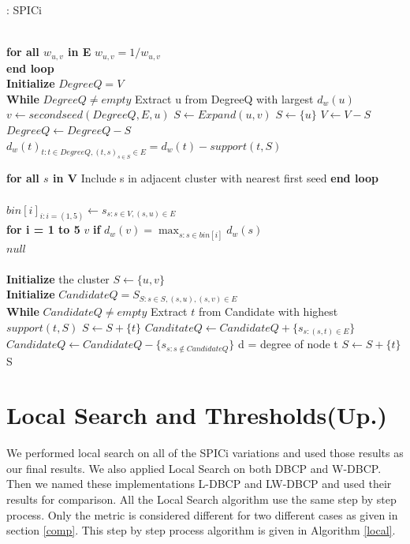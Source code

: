 \documentclass[10pt]{extarticle}
\begin{document}
	\begin{algorithm}
		\caption{: SPICi}\label{mspicicode}
		\begin{algorithmic}[1]
			 \\
			\textbf{for all $w_{u,v}$ in E}
			\State $w_{u,v}=1/w_{u,v}$\\
			\textbf{end loop} \\
			\textbf{Initialize} $DegreeQ = V$ \\
			\textbf{While} $DegreeQ \neq empty$
			\State Extract u from DegreeQ with largest $d_w(u)$
			\State $v \gets secondseed(DegreeQ,E,u)$
			 $S \gets Expand(u,v)$
			\EndIf
			\Else 
			\State $S \gets \{u\}$
			\EndIf
			\State $V \gets V - S $
			\State $Degree Q \gets Degree Q - S$
			\State $d_w(t)_{t:t\in DegreeQ,(t,s)_{s\in S}\in E} = d_w(t) - support(t,S)$
			
			\textbf{for all $s$ in V}
			\State Include s in adjacent cluster with nearest first seed
			\EndIf
			\textbf{end loop}
			\EndProcedure\\
			 \\
			$bin[i]_{i:i=(1,5)} \gets s_{s:s\in V,(s,u)\in E}$ \\
			\textbf{for i = 1 to 5}
			\State \Return $v$ \textbf{if} $d_w(v)=\max_{s:s\in bin[i]}{d_w(s)}$
			\EndIf\\
			\Return $null$
			\EndProcedure\\
			\\
			\textbf{Initialize} the cluster $S \gets \{u,v\}$ \\
			\textbf{Initialize} $CandidateQ = S_{S:s\in S,(s,u),(s,v)\in E}$\\
			\textbf{While} $CandidateQ \neq empty$
			\State Extract $t$ from Candidate with highest $support(t,S)$
			\State $S\gets S+\{t\}$
			\State $CanditateQ \gets CandidateQ + \{s_{s:(s,t)\in E}\}$
			\State $CandidateQ \gets CandidateQ - \{s_{s:s\not\in CandidateQ}\}$
			\Else
			\State d = degree of node t
				\State $S\gets S+\{t\}$
				\EndIf
			\EndIf \\
			\Return S
			\EndProcedure
		\end{algorithmic}
	\end{algorithm}
	
	
	\section{Local Search and Thresholds(Up.)}
	We performed local search on all of the SPICi variations and used those results as our final results. We also applied Local Search on both DBCP and W-DBCP. Then we named these implementations L-DBCP and LW-DBCP and used their results for comparison. All the Local Search algorithm use the same step by step process. Only the metric is considered different for two different cases as given in section \ref{comp}. This step by step process algorithm is given in Algorithm \ref{local}.
	
\end{document}
